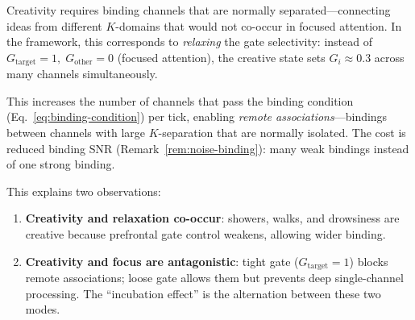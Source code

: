 \documentclass[aps,pre,twocolumn,superscriptaddress,floatfix]{revtex4-2}
\begin{document}
\begin{remark}
\label{rem:creativity}
Creativity requires binding channels that are normally
separated---connecting ideas from different $K$-domains
that would not co-occur in focused attention.
In the framework, this corresponds to \emph{relaxing}
the gate selectivity: instead of
$G_{\text{target}} = 1,\; G_{\text{other}} = 0$
(focused attention), the creative state sets
$G_i \approx 0.3$ across many channels simultaneously.

This increases the number of channels that pass the
binding condition (Eq.~\ref{eq:binding-condition})
per tick, enabling \emph{remote associations}---bindings
between channels with large $K$-separation that are
normally isolated.
The cost is reduced binding SNR
(Remark~\ref{rem:noise-binding}): many weak bindings
instead of one strong binding.

This explains two observations:
\begin{enumerate}
  \item \textbf{Creativity and relaxation co-occur}:
    showers, walks, and drowsiness are creative because
    prefrontal gate control weakens, allowing wider
    binding.
  \item \textbf{Creativity and focus are antagonistic}:
    tight gate ($G_{\text{target}} = 1$) blocks remote
    associations; loose gate allows them but prevents
    deep single-channel processing.
    The ``incubation effect'' is the alternation between
    these two modes.
\end{enumerate}
\end{remark}
\end{document}

